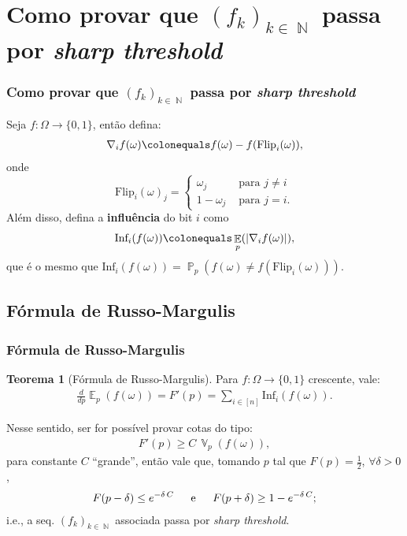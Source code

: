 \documentclass[12pt]{beamer}
\theoremstyle{definition} %
\newtheorem{mythm}{Teorema}
\DeclareMathOperator{\PX}{\mathbb{P}} %
\DeclareMathOperator{\EX}{\mathbb{E}} %
\DeclareMathOperator{\VX}{\mathbb{V}} %
\DeclareMathOperator{\NX}{\mathbb{N}} %
\newcommand{\diff}{{\nabla_i}f(\omega)}
\newcommand{\flip}{\text{Flip}_i(\omega)}
\newcommand{\infl}{\text{Inf}_i(f(\omega))}
\begin{document}
	
	\section{Como provar que $(f_k)_{k \in \NX}$ passa por \textit{sharp threshold}}
	\begin{frame}[t]
		\frametitle{Como provar que $(f_k)_{k \in \NX}$ passa por \textit{sharp threshold}}
		Seja $f: \Omega \longrightarrow  \{0,1\}$, então defina:
		\begin{align*}
			\diff \colonequals f(\omega) - f(\flip),
		\end{align*}
		onde
		\[ \flip_j = \begin{cases}
			\omega_j   & \text{ para } j \neq i \\
			1 - \omega_j & \text{ para } j = i.
		\end{cases}
		\]
		\pause
		Além disso, defina a \textbf{influência} do bit $i$ como 
		\begin{align*}
			\infl \colonequals \EX_p(|\diff|),
		\end{align*}
		que é o mesmo que $\infl = \PX_p(f(\omega) \neq f(\flip))$.
	\end{frame}

	\subsection{Fórmula de Russo-Margulis}
	\begin{frame}[t]
		\frametitle{Fórmula de Russo-Margulis}
		\begin{mythm}[Fórmula de Russo-Margulis]
			Para $f: \Omega \longrightarrow \{0,1\}$ crescente, vale:
			\begin{align*}
				\frac{d}{dp}\EX_p(f(\omega)) = F'(p) = \sum_{i \in [n]} \infl.
			\end{align*}
		\end{mythm}
		\pause
		\vspace{-12pt}
		Nesse sentido, ser for possível provar cotas do tipo:
		\begin{align}\label{eq-desejada}
			F'(p) \geq C \, \VX_p(f(\omega)),
		\end{align}
		para constante $C$ ``grande'', então vale que, tomando $p$ tal que $F(p) = \frac{1}{2}$, $\forall \delta > 0$,
		\begin{align*}
			F(p - \delta) \leq e^{-\delta \, C} \text{\hspace{12pt} e \hspace{12pt}} F(p + \delta) \geq 1 - e^{-\delta \, C};
		\end{align*}
		i.e., a seq. $(f_k)_{k \in \NX}$ associada passa por \textit{sharp threshold}.
	\end{frame}
	
\end{document}
